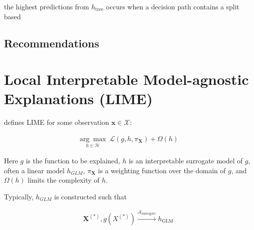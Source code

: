 \documentclass{article}
\begin{document}


the highest predictions from $h_{\text{tree}}$ occurs when a decision path contains a split based 

\subsection{Recommendations}



\section{Local Interpretable Model-agnostic Explanations (LIME)}
\label{sec:lime}

\cite{lime} defines LIME for some observation $\mathbf{x} \in \mathcal{X}$:

\begin{equation}
\begin{aligned}
\underset{h \in \mathcal{H}}{\arg\max}\:\mathcal{L}(g, h, \pi_{\mathbf{X}}) + \Omega(h)
\end{aligned}
\end{equation}

Here $g$ is the function to be explained, $h$ is an interpretable surrogate model of $g$, often a linear model $h_{GLM}$, $\pi_{\mathbf{X}}$ is a weighting function over the domain of $g$, and $\Omega(h)$ limits the complexity of $h$.

\vspace{5pt}

Typically, $h_{GLM}$ is constructed such that

\begin{equation}
\begin{aligned}
\mathbf{X}^{(*)}, g({X}^{(*)}) \xrightarrow{\mathcal{A}_{\text{surrogate}}} h_{\text{GLM}}
\end{aligned}
\end{equation}
\end{document}
